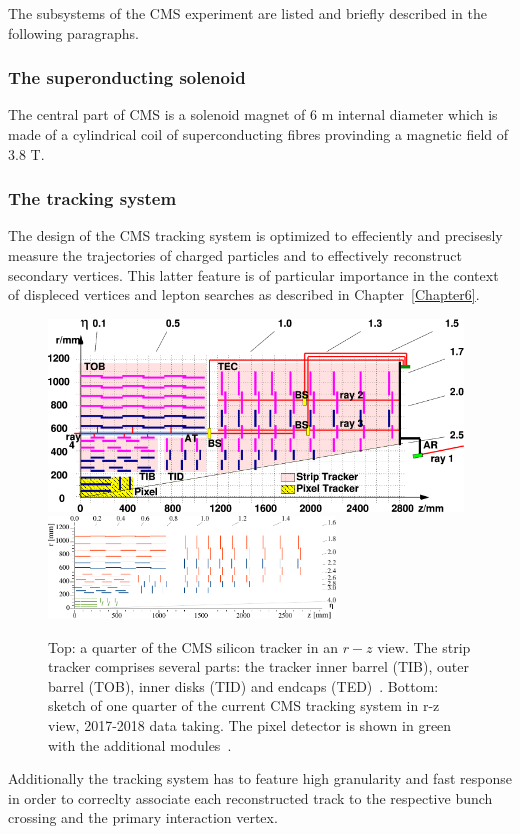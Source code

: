 The subsystems of the CMS experiment are listed and briefly described
in the following paragraphs.

\subsubsection{The superonducting solenoid}
The central part of CMS is a solenoid magnet of 6 m internal diameter
which is made of a cylindrical coil of superconducting fibres
provinding a magnetic field of 3.8 T. 
\subsubsection{The tracking system}\label{sec:tracking}
The design of the CMS tracking system is optimized to
effeciently and precisesly measure the trajectories of charged
particles and to effectively reconstruct secondary vertices. This latter feature is of particular
importance in the context of displeced vertices and lepton searches as
described in Chapter~\ref{Chapter6}.

\begin{figure}[h]
\centering
\includegraphics[width=0.98\textwidth]{Figures/c2/las}\\
\vspace{0.5cm}
\includegraphics[width=0.68\textwidth]{Figures/c2/Phase1_Tracker_1Quarter.pdf}

\caption{Top: a quarter of the CMS silicon tracker in an $r-z$
  view. The strip tracker comprises several parts: the tracker inner
  barrel (TIB), outer barrel (TOB), inner disks (TID) and endcaps
  (TED)~\cite{Adam:1171503}. Bottom:
sketch of one quarter of the current CMS tracking system in
  r-z view, 2017-2018 data taking. The pixel detector is shown in
  green with the additional modules~\cite{trackingPU}.}
\label{fig:tracker}
\end{figure} 
Additionally the tracking system has to feature high granularity and
fast response in order to correclty associate each reconstructed track
to the respective bunch crossing and the primary interaction vertex.


